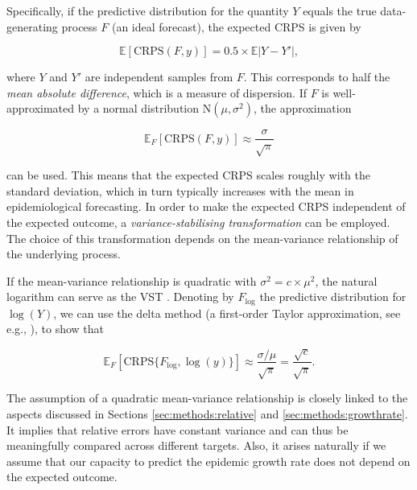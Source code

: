 \documentclass{article}
\begin{document}
Specifically, if the predictive distribution for the quantity $Y$ equals the true data-generating process $F$ (an ideal forecast), the expected CRPS is given by \citep{gneitingStrictlyProperScoring2007}
\begin{linenomath*}
\begin{equation}
\mathbb{E}[\text{CRPS}(F, y)] = 0.5\times\mathbb{E}|Y - Y'|,
\end{equation}
\end{linenomath*}
where $Y$ and $Y'$ are independent samples from $F$. This corresponds to half the \textit{mean absolute difference}, which is a measure of dispersion. If $F$ is well-approximated by a normal distribution $\text{N}(\mu, \sigma^2)$, the approximation
\begin{linenomath*}
\begin{equation}
\mathbb{E}_F[\text{CRPS}(F, y)] \approx \frac{\sigma}{\sqrt{\pi}}
\end{equation}
\end{linenomath*}
can be used. This means that the expected CRPS scales roughly with the standard deviation, which in turn typically increases with the mean in epidemiological forecasting. In order to make the expected CRPS independent of the expected outcome, a \textit{variance-stabilising transformation} \citep[VST,][]{bartlettSquareRootTransformation1936} can be employed. The choice of this transformation depends on the mean-variance relationship of the underlying process. 

If the mean-variance relationship is quadratic with $\sigma^2 = c \times \mu^2$, the natural logarithm can serve as the VST \citep{guerreroTimeseriesAnalysisSupported1993}. Denoting by $F_{\log}$ the predictive distribution for $\log(Y)$, we can use the delta method (a first-order Taylor approximation, see e.g., \cite{Dunn2018}), to show that
\begin{linenomath*}
\begin{equation}
\mathbb{E}_F[\text{CRPS}\{F_{\log}, \log(y)\}] \approx \frac{\sigma/\mu}{\sqrt{\pi}} 
= \frac{\sqrt{c}}{\sqrt{\pi}}
.
\end{equation}
\end{linenomath*}
The assumption of a quadratic mean-variance relationship is closely linked to the aspects discussed in Sections \ref{sec:methods:relative} and \ref{sec:methods:growthrate}. It implies that relative errors have constant variance and can thus be meaningfully compared across different targets. Also, it arises naturally if we assume that our capacity to predict the epidemic growth rate does not depend on the expected outcome.
\end{document}

